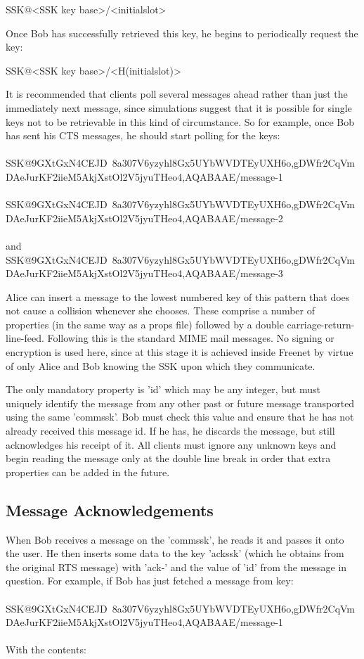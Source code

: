 \documentclass[12pt,a4paper]{article}
\begin{document}
SSK@<SSK key base>/<initialslot>

Once Bob has successfully retrieved this key, he begins to periodically request the key:

SSK@<SSK key base>/<H(initialslot)>

It is recommended that clients poll several messages ahead rather than just the immediately next message, since simulations suggest that it is possible for single keys not to be retrievable in this kind of circumstance. So for example, once Bob has sent his CTS messages, he should start polling for the keys: \\
\\
SSK@9GXtGxN4CEJD~8a\-307V6yzyhl8Gx5U\-YbWVDTEyUXH6o,gDWfr2CqVm\-DAeJurKF2iieM\-5AkjXstOl2V5j\-yuTHeo4,AQABAAE/message-1 \\
\\
SSK@9GXtGxN4CEJD~8a\-307V6yzyhl8Gx5U\-YbWVDTEyUXH6o,gDWfr2CqVm\-DAeJurKF2iieM\-5AkjXstOl2V5j\-yuTHeo4,AQABAAE/message-2 \\
\\
and \\
SSK@9GXtGxN4CEJD~8a\-307V6yzyhl8Gx5U\-YbWVDTEyUXH6o,gDWfr2CqVm\-DAeJurKF2iieM\-5AkjXstOl2V5j\-yuTHeo4,AQABAAE/message-3

Alice can insert a message to the lowest numbered key of this pattern that does not cause a collision whenever she chooses. These comprise a number of properties (in the same way as a props file) followed by a double carriage-return-line-feed. Following this is the standard MIME mail messages. No signing or encryption is used here, since at this stage it is achieved inside Freenet by virtue of only Alice and Bob knowing the SSK upon which they communicate.

The only mandatory property is 'id' which may be any integer, but must uniquely identify the message from any other past or future message transported using the same 'commssk'. Bob must check this value and ensure that he has not already received this message id. If he has, he discards the message, but still acknowledges his receipt of it. All clients must ignore any unknown keys and begin reading the message only at the double line break in order that extra properties can be added in the future.

\subsection{Message Acknowledgements}
When Bob receives a message on the 'commssk', he reads it and passes it onto the user. He then inserts some data to the key 'ackssk' (which he obtains from the original RTS message) with 'ack-' and the value of 'id' from the message in question. For example, if Bob has just fetched a message from key: \\
\\
SSK@9GXtGxN4CEJD~8a\-307V6yzyhl8Gx5U\-YbWVDTEyUXH6o,gDWfr2CqVm\-DAeJurKF2iieM\-5AkjXstOl2V5j\-yuTHeo4,AQABAAE/message-1 \\
\\
With the contents: \\
\\
\end{document}
